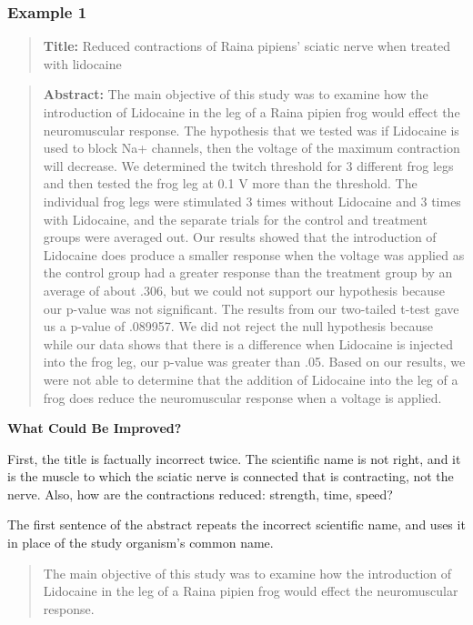 \documentclass[
]{book}
\begin{document}
\hypertarget{example-1}{%
\subsubsection{Example 1}\label{example-1}}

\begin{quote}
\textbf{Title:} Reduced contractions of Raina pipiens' sciatic nerve when treated with lidocaine
\end{quote}

\begin{quote}
\textbf{Abstract:} The main objective of this study was to examine how the introduction of Lidocaine in the leg of a Raina pipien frog would effect the neuromuscular response. The hypothesis that we tested was if Lidocaine is used to block Na+ channels, then the voltage of the maximum contraction will decrease. We determined the twitch threshold for 3 different frog legs and then tested the frog leg at 0.1 V more than the threshold. The individual frog legs were stimulated 3 times without Lidocaine and 3 times with Lidocaine, and the separate trials for the control and treatment groups were averaged out. Our results showed that the introduction of Lidocaine does produce a smaller response when the voltage was applied as the control group had a greater response than the treatment group by an average of about .306, but we could not support our hypothesis because our p-value was not significant. The results from our two-tailed t-test gave us a p-value of .089957. We did not reject the null hypothesis because while our data shows that there is a difference when Lidocaine is injected into the frog leg, our p-value was greater than .05. Based on our results, we were not able to determine that the addition of Lidocaine into the leg of a frog does reduce the neuromuscular response when a voltage is applied.
\end{quote}

\textbf{What Could Be Improved?}

First, the title is factually incorrect twice. The scientific name is not right, and it is the muscle to which the sciatic nerve is connected that is contracting, not the nerve. Also, how are the contractions reduced: strength, time, speed?

The first sentence of the abstract repeats the incorrect scientific name, and uses it in place of the study organism's common name.

\begin{quote}
The main objective of this study was to examine how the introduction of Lidocaine in the leg of a Raina pipien frog would effect the neuromuscular response.
\end{quote}
\end{document}

